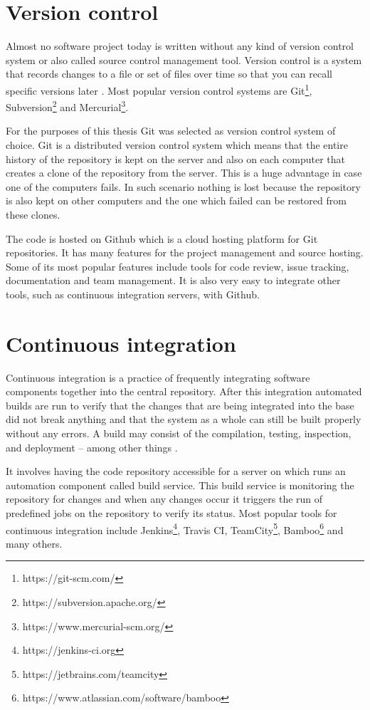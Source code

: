 \documentclass[
  digital, %
  table,   %
  lof,     %
  nolot,     %
]{fithesis3}
\begin{document}
\section{Version control}
Almost no software project today is written without any kind of version control system or also called source control management tool. Version control is a system that records changes to a file or set of files over time so that you can recall specific versions later \cite{proGit}. Most popular version control systems are Git\footnote{https://git-scm.com/}, Subversion\footnote{https://subversion.apache.org/} and Mercurial\footnote{https://www.mercurial-scm.org/}.

For the purposes of this thesis Git was selected as version control system of choice. Git is a distributed version control system which means that the entire history of the repository is kept on the server and also on each computer that creates a clone of the repository from the server. This is a huge advantage in case one of the computers fails. In such scenario nothing is lost because the repository is also kept on other computers and the one which failed can be restored from these clones.

The code is hosted on Github which is a cloud hosting platform for Git repositories. It has many features for the project management and source hosting. Some of its most popular features include tools for code review, issue tracking, documentation and team management. It is also very easy to integrate other tools, such as continuous integration servers, with Github.

\section{Continuous integration}
Continuous integration is a practice of frequently integrating software components together into the central repository. After this integration automated builds are run to verify that the changes that are being integrated into the base did not break anything and that the system as a whole can still be built properly without any errors. A build may consist of the compilation, testing, inspection, and deployment -- among other things \cite{ci}.

It involves having the code repository accessible for a server on which runs an automation component called build service. This build service is monitoring the repository for changes and when any changes occur it triggers the run of predefined jobs on the repository to verify its status. Most popular tools for continuous integration include Jenkins\footnote{https://jenkins-ci.org}, Travis CI, TeamCity\footnote{https://jetbrains.com/teamcity}, Bamboo\footnote{https://www.atlassian.com/software/bamboo} and many others.
\end{document}
